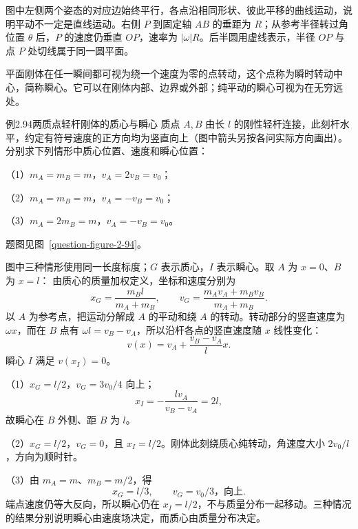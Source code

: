 \RigidMotionTypesDiagram
图中左侧两个姿态的对应边始终平行，各点沿相同形状、彼此平移的曲线运动，说明平动不一定是直线运动。右侧 $P$ 到固定轴 $AB$ 的垂距为 $R$；从参考半径转过角位置 $\theta$ 后，$P$ 的速度仍垂直 $OP$，速率为 $|\omega|R$。后半圆用虚线表示，半径 $OP$ 与点 $P$ 处切线属于同一圆平面。

平面刚体在任一瞬间都可视为绕一个速度为零的点转动，这个点称为瞬时转动中心，简称瞬心。它可以在刚体内部、边界或外部；纯平动的瞬心可视为在无穷远处。

\KinematicKeepSpace{14cm}
\begin{origexamplebox}{例2.94\quad 两质点轻杆刚体的质心与瞬心}
质点 $A,B$ 由长 $l$ 的刚性轻杆连接，此刻杆水平，约定有符号速度的正方向均为竖直向上（图中箭头另按各问实际方向画出）。分别求下列情形中质心位置、速度和瞬心位置：\par
（1）$m_A=m_B=m$，$v_A=2v_B=v_0$；\par
（2）$m_A=m_B=m$，$v_A=-v_B=v_0$；\par
（3）$m_A=2m_B=m$，$v_A=-v_B=v_0$。
\par 题图见图~\ref{question-figure-2-94}。
\KQuestionDQ
\end{origexamplebox}
\begin{xesolution}
图中三种情形使用同一长度标度；$G$ 表示质心，$I$ 表示瞬心。取 $A$ 为 $x=0$、$B$ 为 $x=l$：
\RigidBarCasesDiagram
由质心的质量加权定义，坐标和速度分别为
\[
x_G=\frac{m_Bl}{m_A+m_B},\qquad
v_G=\frac{m_Av_A+m_Bv_B}{m_A+m_B}.
\]
以 $A$ 为参考点，把运动分解成 $A$ 的平动和绕 $A$ 的转动。转动部分的竖直速度为 $\omega x$，而在 $B$ 点有 $\omega l=v_B-v_A$，所以沿杆各点的竖直速度随 $x$ 线性变化：
\[
v(x)=v_A+\frac{v_B-v_A}{l}x.
\]
瞬心 $I$ 满足 $v(x_I)=0$。

（1）$x_G=l/2$，$v_G=3v_0/4$ 向上；
\[
x_I=-\frac{lv_A}{v_B-v_A}=2l,
\]
故瞬心在 $B$ 外侧、距 $B$ 为 $l$。

（2）$x_G=l/2$，$v_G=0$，且 $x_I=l/2$。刚体此刻绕质心纯转动，角速度大小 $2v_0/l$，方向为顺时针。

（3）由 $m_A=m$、$m_B=m/2$，得
\[
\boxed{x_G=l/3},\qquad \boxed{v_G=v_0/3\text{，向上}}.
\]
端点速度仍等大反向，所以瞬心仍在 $\boxed{x_I=l/2}$，不与质量分布一起移动。三种情况的结果分别说明瞬心由速度场决定，而质心由质量分布决定。
\end{xesolution}

